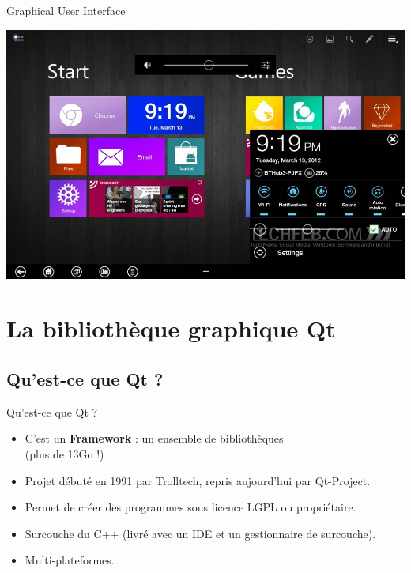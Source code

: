 \documentclass[12pt]{beamer}
\begin{document}
           \begin{frame}{Graphical User Interface}
       
     \includegraphics[width=1\textwidth]{pictures/gui.png}
        \end{frame}
    
        
\section{La bibliothèque graphique Qt}
    \subsection{Qu'est-ce que Qt ?}
        \begin{frame}{Qu'est-ce que Qt ?}
            \begin{itemize}
                \item{C'est un \textbf{Framework} : un ensemble de bibliothèques\\(plus de 13Go !)}
                \item{Projet débuté en 1991 par Trolltech, repris aujourd'hui par Qt-Project.}
                \item{Permet de créer des programmes sous licence LGPL ou propriétaire.}
                \item{Surcouche du C++ (livré avec un IDE et un gestionnaire de surcouche).}
                \item{Multi-plateformes.}
            \end{itemize}
        \end{frame}
        
    
    
\end{document}
